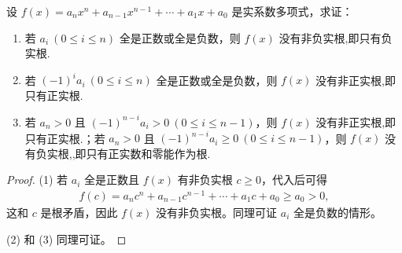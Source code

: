 \documentclass[lang=cn,newtx,10pt,scheme=chinese]{elegantbook}
\begin{document}
\begin{proposition}\label{proposition:实系数多项式的根的符号判定准则}
设 $f(x) = a_n x^n + a_{n-1} x^{n-1} + \cdots + a_1 x + a_0$ 是实系数多项式，求证：
\begin{enumerate}[(1)]
\item 若 $a_i \ (0 \leq i \leq n)$ 全是正数或全是负数，则 $f(x)$ 没有非负实根,即只有负实根.
\item 若 $(-1)^i a_i \ (0 \leq i \leq n)$ 全是正数或全是负数，则 $f(x)$ 没有非正实根,即只有正实根.
\item 若 $a_n > 0$ 且 $(-1)^{n-i} a_i > 0 \ (0 \leq i \leq n-1)$，则 $f(x)$ 没有非正实根,即只有正实根.；若 $a_n > 0$ 且 $(-1)^{n-i} a_i \geq 0 \ (0 \leq i \leq n-1)$，则 $f(x)$ 没有负实根,,即只有正实数和零能作为根.
\end{enumerate}
\end{proposition}
\begin{proof}
(1) 若 $a_i$ 全是正数且 $f(x)$ 有非负实根 $c \geq 0$，代入后可得
\begin{align*}
f(c) = a_n c^n + a_{n-1} c^{n-1} + \cdots + a_1 c + a_0 \geq a_0 > 0,
\end{align*}
这和 $c$ 是根矛盾，因此 $f(x)$ 没有非负实根。同理可证 $a_i$ 全是负数的情形。

(2) 和 (3) 同理可证。
\end{proof}
\end{document}

